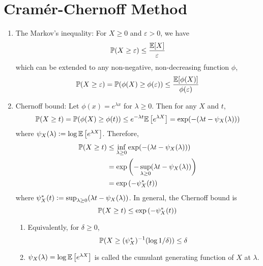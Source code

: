 \section{Cram\'er-Chernoff Method}
\begin{enumerate}[label=\arabic{*}.]
	\item The Markov's inequality: For $X \geq 0$ and $\varepsilon > 0$, we have
	\begin{equation*}
	    \mathbb{P}(X \geq \varepsilon) \leq \frac{\mathbb{E}[X]}{\varepsilon}
	\end{equation*}
	which can be extended to any non-negative, non-decreasing function $\phi$,
	\begin{equation*}
	    \mathbb{P}(X \geq \varepsilon) = \mathbb{P}(\phi(X) \geq \phi(\varepsilon)) \leq \frac{\mathbb{E}[\phi(X)]}{\phi(\varepsilon)}
	\end{equation*}

	\item Chernoff bound: Let $\phi(x) = e^{\lambda x}$ for $\lambda \geq 0$. Then for any $X$ and $t$,
	\begin{equation*}
		\mathbb{P}(X \geq t) = \mathbb{P}(\phi(X) \geq \phi(t)) \leq e^{-\lambda t} \mathbb{E}\left[e^{\lambda X}\right] = \exp(-(\lambda t - \psi_X(\lambda)))
	\end{equation*}
	where $\psi_X(\lambda) \vcentcolon= \log \mathbb{E}\left[e^{\lambda X}\right]$. Therefore,
	\begin{equation*}
		\begin{aligned}
			\mathbb{P}(X \geq t) &\leq \inf_{\lambda \geq 0} \exp(-(\lambda t - \psi_X(\lambda))) \\
			&=\exp\left(-\sup_{\lambda \geq 0}(\lambda t - \psi_X(\lambda))\right) \\
			&=\exp\left(-\psi_X^*(t)\right)
		\end{aligned}
	\end{equation*}
	where $\psi_X^*(t)\vcentcolon= \sup_{\lambda \geq 0}(\lambda t - \psi_X(\lambda))$. In general, the Chernoff bound is
	\begin{equation*}
		\mathbb{P}(X \geq t) \leq \exp\left(-\psi_X^*(t)\right)
	\end{equation*}
	\begin{rmk}
	    \begin{enumerate}[label=(\arabic{*})]
	    	\item Equivalently, for $\delta \geq 0$,
	    	\begin{equation*}
	    		\mathbb{P}(X \geq (\psi_X^*)^{-1}(\log 1/ \delta)) \leq \delta
	    	\end{equation*}

	    	\item $\psi_X(\lambda) = \log \mathbb{E}\left[e^{\lambda X}\right]$ is called the cumulant generating function of $X$ at $\lambda$.


\end{enumerate}
\end{rmk}
\end{enumerate}
